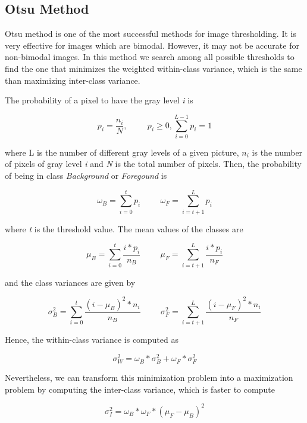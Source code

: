 \documentclass[12]{article}
\begin{document}
\subsection{Otsu Method}
Otsu method is one of the most successful methods for image thresholding. It is very effective for images which are bimodal. However, it may not be accurate for non-bimodal images. In this method we search among all possible thresholds to find the one that minimizes the weighted within-class variance, which is the same than maximizing inter-class variance.

The probability of a pixel to have the gray level \textit{i} is
\vspace{-0.5cm}
\begin{center}
$$ p_i = \frac{n_i}{N}, \hspace{1cm} p_i \geqslant 0, \sum_{i = 0}^{L - 1} p_i = 1  $$
\end{center}
where L is the number of different gray levels of a given picture, $n_i$ is the number of pixels of gray level \textit{i} and \textit{N} is the total number of pixels. Then, the probability of being in class \textit{Background} or \textit{Foregound} is
\vspace{-0.5cm}
\begin{center}
$$ \omega_B = \sum_{i = 0}^{t} p_i \hspace{1cm} \omega_F = \sum_{i = t + 1}^{L} p_i $$
\end{center}
where \textit{t} is the threshold value. The mean values of the classes are
\vspace{-0.5cm}
\begin{center}
$$ \mu_B = \sum_{i = 0}^{t} \frac{i * p_i}{n_B} \hspace{1cm} \mu_F = \sum_{i = t + 1}^{L} \frac{i * p_i}{n_F} $$
\end{center}
and the class variances are given by
\vspace{-0.5cm}
\begin{center}
$$ \sigma_{B}^{2} = \sum_{i = 0}^{t} \frac{(i - \mu_B)^2 * n_i}{n_B} \hspace{1cm} \sigma_{F}^{2} = \sum_{i = t + 1}^{L} \frac{(i - \mu_F)^2 * n_i}{n_F} $$
\end{center}
Hence, the within-class variance is computed as
\vspace{-0.5cm}
\begin{center}
$$ \sigma_{W}^{2} = \omega_B * \sigma_{B}^{2} + \omega_F * \sigma_{F}^{2} $$
\end{center}
Nevertheless, we can transform this minimization problem into a maximization problem by computing the inter-class variance, which is faster to compute
\vspace{-0.5cm}
\begin{center}
$$ \sigma_{I}^{2} = \omega_B * \omega_F * (\mu_F - \mu_B)^2 $$
\end{center}
\end{document}
